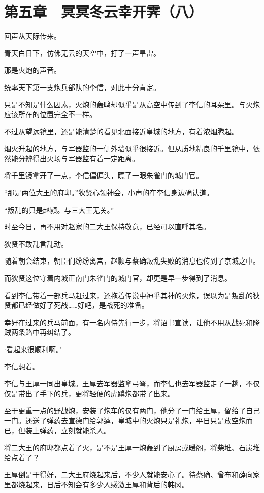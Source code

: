 \section{第五章　冥冥冬云幸开霁（八）}

回声从天际传来。

青天白日下，仿佛无云的天空中，打了一声旱雷。

那是火炮的声音。

统率天下第一支炮兵部队的李信，对此十分肯定。

只是不知是什么因素，火炮的轰鸣却似乎是从高空中传到了李信的耳朵里。与火炮应该所在的位置完全不一样。

不过从望远镜里，还是能清楚的看见北面接近皇城的地方，有着浓烟腾起。

烟火升起的地方，与军器监的一侧外墙似乎很接近。但从质地精良的千里镜中，依然能分辨得出火场与军器监有着一定距离。

将千里镜拿开了一点，李信偏偏头，瞟了一眼朱雀门的城门官。

“那是两位大王的府邸。”狄贤心领神会，小声的在李信身边确认道。

“叛乱的只是赵颢。与三大王无关。”

时至今日，再不用对赵家的二大王保持敬意，已经可以直呼其名。

狄贤不敢乱言乱动。

随着朝会结束，朝臣们纷纷离宫，赵颢与蔡确叛乱失败的消息也传到了京城之中。

而狄贤这位守着内城正南门朱雀门的城门官，却更是早一步得到了消息。

看到李信带着一部兵马赶过来，还拖着传说中神乎其神的火炮，误以为是叛乱的狄贤都已经做好了死战……好吧，是战死的准备。

幸好在过来的兵马前面，有一名内侍先行一步，将诏书宣读，让他不用从战死和降贼两条路中再纠结了。

‘看起来很顺利啊。’

李信想着。

李信与王厚一同出皇城。王厚去军器监拿弓弩，而李信也去军器监走了一趟，不仅仅是带出了手下的兵，更将轻便的虎蹲炮都带了出来。

至于更重一点的野战炮，安装了炮车的仅有两门，他分了一门给王厚，留给了自己一门。还送了弹药去宣德门给郭逵，皇城中的火炮只是礼炮，平日只是放空炮而已，但装上弹药，立刻就能杀人。

将二大王的府邸都点着了火，是不是王厚一炮轰到了厨房或暖阁，将柴堆、石炭堆给点着了？

王厚倒是干得好，二大王府烧起来后，不少人就能安心了。待蔡确、曾布和薛向家里都烧起来，日后不知会有多少人感激王厚和背后的韩冈。

